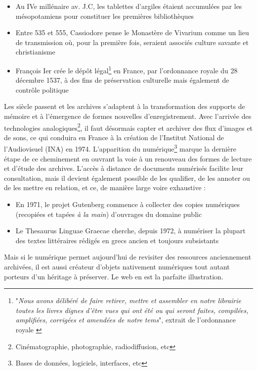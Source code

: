 \documentclass[symmetric,justified,marginals=raggedouter]{tufte-book}
\begin{document}
\begin{itemize}[leftmargin=*]  
\item Au IVe millénaire av. J.C, les tablettes d'argiles étaient accumulées par les mésopotamiens pour constituer les premières bibliothèques
\item Entre 535 et 555, Cassiodore pense le Monastère de Vivarium comme un lieu de transmission où, pour la première fois, seraient associés culture savante et christianisme
\item François Ier crée le dépôt légal\footnote{"\textit{Nous avons délibéré de faire retirer, mettre et assembler en notre librairie toutes les livres dignes d'être vues qui ont été ou qui seront faites, compilées, amplifiées, corrigées et amendées de notre tems}", extrait de l'ordonnance royale \citep{dougnac_depot_1960}} en France, par l'ordonnance royale du 28 décembre 1537, à des fins de préservation culturelle mais également de contrôle politique
\end{itemize}

\noindent Les siècle passent et les archives s'adaptent à la transformation des supports de mémoire et à l'émergence de formes nouvelles d'enre\-gistrement. Avec l'arrivée des technologies analogiques\footnote{Cinématographie, photographie, radiodiffusion, etc}, il faut désormais capter et archiver des flux d'images et de sons, ce qui conduira en France à la création de l'Institut National de l'Audiovisuel (INA) en 1974. L'apparition du numérique\footnote{Bases de données, logiciels, interfaces, etc} marque la dernière étape de ce cheminement en ouvrant la voie à un renouveau des formes de lecture et d'étude des archives. L'accès à distance de documents numérisés facilite leur consultation, mais il devient également possible de les qualifier, de les annoter ou de les mettre en relation, et ce, de manière large voire exhaustive \citep{borgman_digital_2000} :

\begin{itemize}[leftmargin=*]  
\item En 1971, le projet Gutenberg commence à collecter des copies numéri\-ques (recopiées et tapées \textit{à la main}) d'ouvrages du domaine public
\item Le Thesaurus Linguae Graecae cherche, depuis 1972, à numériser la plupart des textes littéraires rédigés en grecs ancien et toujours subsistants
\end{itemize}

\noindent Mais si le numérique permet aujourd'hui de revisiter des ressources anciennement archivées, il est aussi créateur d'objets nativement numé\-riques tout autant porteurs d'un héritage à préserver. Le web en est la parfaite illustration.
\end{document}

